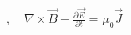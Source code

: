 \documentclass[preview]{standalone}
\begin{document}
\begin{align*}
,\quad \nabla \times \vec{B} - \frac{\partial \vec{E}}{\partial t} = \mu_0 \vec{J}
\end{align*}
\end{document}
